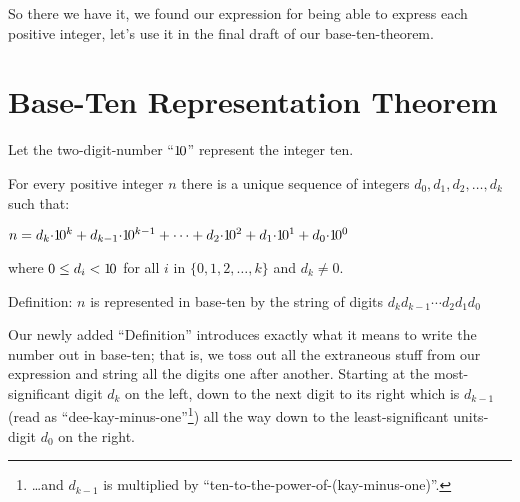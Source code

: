 \documentclass{article}
\newenvironment{jprIn}{\begin{adjustwidth}{2em}{}}{\end{adjustwidth}}
\begin{document}
So there we have it, we found our expression for being able to
express each positive integer, let's use
it in the final draft of our base-ten-theorem.

\section*{Base-Ten Representation Theorem}
\begin{jprIn}
Let the two-digit-number ``${1\hspace{-0.12em}0}$'' represent the integer ten.

For every positive integer $n$ there is a unique
sequence of integers $d_0, d_1, d_2,\dots{},d_k$ such that:

\hspace{3em}$n
=d_k{\cdot}{1\hspace{-0.12em}0}^k
+d_{k-1}{\cdot}{1\hspace{-0.12em}0}^{k-1}
+\dots
+d_2{\cdot}{1\hspace{-0.12em}0}^2
+d_1{\cdot}{1\hspace{-0.12em}0}^1
+d_0{\cdot}{1\hspace{-0.12em}0}^0$

where $0\le{}d_i<{1\hspace{-0.12em}0}$ for all $i$ in $\{0,1,2,\dots{},k\}$ and $d_k\ne0$.

Definition: $n$ is represented in base-ten by the string of digits $d_kd_{k-1}{\cdots}d_2d_1d_0$
\end{jprIn}

% 
% 
% 

Our newly added ``Definition'' introduces exactly what it means to write
the number out in base-ten; that is,
we toss out all the extraneous stuff from our expression
and string all the digits one after another.
Starting at the most-significant digit $d_k$ on the left,
down to the next digit to its right which is $d_{k-1}$
(read as ``dee-kay-minus-one''\footnote{\dots{}and $d_{k-1}$ is
multiplied by ``ten-to-the-power-of-(kay-minus-one)''.})
all the way down to the least-significant units-digit $d_0$ on the right.
\end{document}
